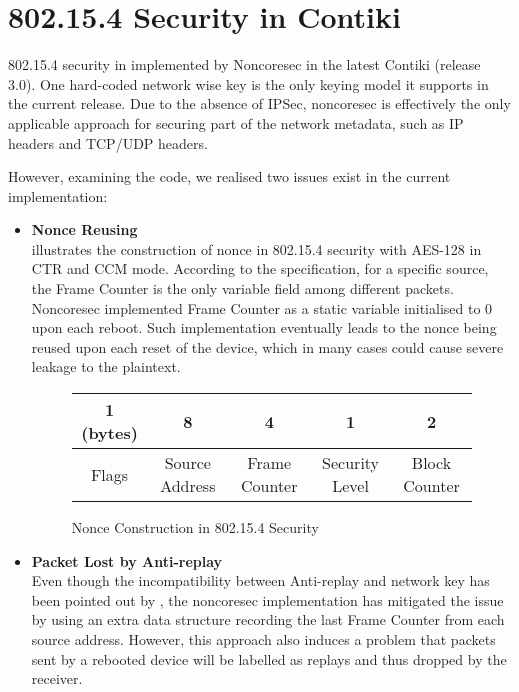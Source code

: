 \section{802.15.4 Security in Contiki\label{noncoresec}}
802.15.4 security in implemented by Noncoresec\cite{noncoresec} in the latest Contiki  (release 3.0). One hard-coded network wise key is the only keying model it supports in the current release. Due to the absence of IPSec\cite{rfc4301}, noncoresec is effectively the only applicable approach for securing part of the network metadata, such as IP headers and TCP/UDP headers.


However, examining the code, we realised two issues exist in the current implementation:
\begin{itemize}
	\item \textbf{Nonce Reusing} \\
	 illustrates the construction of nonce in 802.15.4 security with AES-128 in CTR and CCM mode. According to the specification\cite{802154}, for a specific source, the Frame Counter is the only variable field among different packets. Noncoresec implemented Frame Counter as a static variable initialised to 0 upon each reboot. Such implementation eventually leads to the nonce being reused upon each reset of  the device, which in many cases could cause severe leakage to the plaintext.
	
	\begin{figure}[th!]
	\centering
	{
		\begin{tabular}{|c|c|c|c|c|}
			\hline 
			1 (bytes) & 8              & 4             & 1              & 2             \\ \hline
			Flags      & Source Address & Frame Counter & Security Level & Block Counter \\ \hline
		\end{tabular}
	}
	\caption{Nonce Construction in 802.15.4 Security}
	\label{NoncoresecNonce}
	\end{figure}
	
	\item \textbf{Packet Lost by Anti-replay} \\
	Even though the incompatibility between Anti-replay and network key has been pointed out by \cite{802154SecIssues}, the noncoresec implementation has mitigated the issue by using an extra data structure recording the last Frame Counter from each source address. However, this approach also induces a problem that packets sent by a rebooted device will be labelled as replays and thus dropped by the receiver.
\end{itemize}

